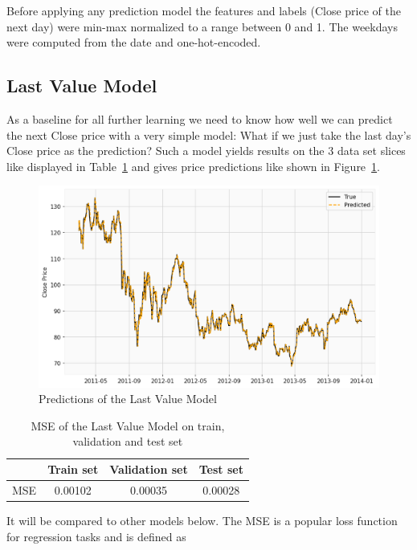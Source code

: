 \documentclass[utf8x]{ctexart}
\begin{document}
Before applying any prediction model the features and labels (Close price of the next day) were min-max normalized to a range between 0 and 1. The weekdays were computed from the date and one-hot-encoded.

\subsection{Last Value Model}

As a baseline for all further learning we need to know how well we can predict the next Close price with a very simple model: What if we just take the last day's Close price as the prediction?
Such a model yields results on the 3 data set slices like displayed in Table~\ref{tab:last_value_model} and gives price predictions like shown in Figure~\ref{fig:last_value_model}.

\begin{figure}[htb]
  \centering
  \includegraphics[width=\textwidth]{../images/last_value_model.png}
  \caption{Predictions of the Last Value Model}
  \label{fig:last_value_model}
\end{figure}

\begin{table}[ht]
  \centering
  \caption{MSE of the Last Value Model on train, validation and test set}
  \label{tab:last_value_model}
  \begin{tabular}{c|ccc}
        & Train set & Validation set & Test set \\
    \hline
    MSE & 0.00102   & 0.00035        & 0.00028  \\
  \end{tabular}
\end{table}

It will be compared to other models below.
The MSE is a popular loss function for regression tasks and is defined as
\end{document}
